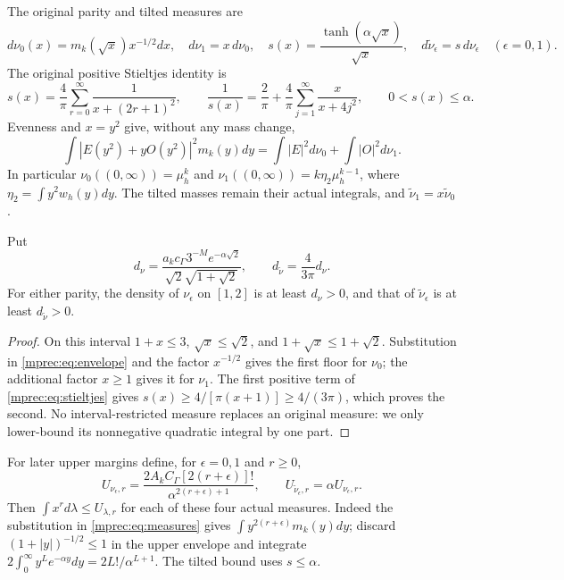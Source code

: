 The original parity and tilted measures are
\begin{equation}\label{mprec:eq:measures}
 d\nu_0(x)=m_k(\sqrt x)x^{-1/2}dx,\quad d\nu_1=x\,d\nu_0,
 \quad s(x)=\frac{\tanh(\alpha\sqrt x)}{\sqrt x},\quad
 d\widetilde\nu_\epsilon=s\,d\nu_\epsilon\quad(\epsilon=0,1).
\end{equation}
The original positive Stieltjes identity \cite{mprec:PP,mprec:FM} is
\begin{equation}\label{mprec:eq:stieltjes}
 s(x)=\frac4\pi\sum_{r=0}^\infty\frac1{x+(2r+1)^2},\qquad
 \frac1{s(x)}=\frac2\pi+\frac4\pi\sum_{j=1}^\infty\frac{x}{x+4j^2},
 \qquad 0<s(x)\le\alpha.
\end{equation}
Evenness and $x=y^2$ give, without any mass change,
\[
 \int|E(y^2)+yO(y^2)|^2m_k(y)dy
 =\int|E|^2d\nu_0+\int|O|^2d\nu_1.
\]
In particular $\nu_0((0,\infty))=\mu_h^k$ and
$\nu_1((0,\infty))=k\eta_2\mu_h^{k-1}$, where
$\eta_2=\int y^2w_h(y)dy$. The tilted masses remain their actual
integrals, and $\widetilde\nu_1=x\widetilde\nu_0$.

\begin{mpreclemma}\label{mprec:lem:floor}
Put
\begin{equation}\label{mprec:eq:densityfloor}
 d_\nu=\frac{a_kc_\Gamma3^{-M}e^{-\alpha\sqrt2}}
 {\sqrt2\sqrt{1+\sqrt2}},\qquad
 d_{\widetilde\nu}=\frac4{3\pi}d_\nu.
\end{equation}
For either parity, the density of $\nu_\epsilon$ on $[1,2]$ is at
least $d_\nu>0$, and that of $\widetilde\nu_\epsilon$ is at least
$d_{\widetilde\nu}>0$.
\end{mpreclemma}
\begin{proof}
On this interval $1+x\le3$, $\sqrt x\le\sqrt2$, and
$1+\sqrt x\le1+\sqrt2$. Substitution in \eqref{mprec:eq:envelope}
and the factor $x^{-1/2}$ gives the first floor for $\nu_0$;
the additional factor $x\ge1$ gives it for $\nu_1$.
The first positive term of \eqref{mprec:eq:stieltjes} gives
$s(x)\ge4/[\pi(x+1)]\ge4/(3\pi)$, which proves the second.
No interval-restricted measure replaces an original measure: we
only lower-bound its nonnegative quadratic integral by one part.
\end{proof}

For later upper margins define, for $\epsilon=0,1$ and $r\ge0$,
\begin{equation}\label{mprec:eq:momentcaps}
 U_{\nu_\epsilon,r}=
 \frac{2A_kC_\Gamma[2(r+\epsilon)]!}
 {\alpha^{2(r+\epsilon)+1}},\qquad
 U_{\widetilde\nu_\epsilon,r}=\alpha U_{\nu_\epsilon,r}.
\end{equation}
Then $\int x^r d\lambda\le U_{\lambda,r}$ for each of these
four actual measures. Indeed the substitution in
\eqref{mprec:eq:measures} gives $\int y^{2(r+\epsilon)}m_k(y)dy$;
discard $(1+|y|)^{-1/2}\le1$ in the upper envelope and integrate
$2\int_0^\infty y^Le^{-\alpha y}dy=2L!/\alpha^{L+1}$.
The tilted bound uses $s\le\alpha$.

